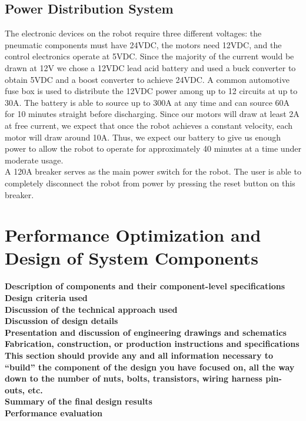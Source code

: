 \documentclass[letterpaper,12pt]{article}
\newcommand{\xxx}[1]{{\color{red}\bf #1}}
\begin{document}
\subsection{Power Distribution System}
The electronic devices on the robot require three different voltages: the
pneumatic components must have 24VDC, the motors need 12VDC, and the control
electronics operate at 5VDC. Since the majority of the current would be drawn
at 12V we chose a 12VDC lead acid battery and used a buck converter to obtain
5VDC and a boost converter to achieve 24VDC. A common automotive fuse box is
used to distribute the 12VDC power among up to 12 circuits at up to 30A. The
battery is able to source up to 300A at any time and can source 60A for 10
minutes straight before discharging. Since our motors will draw at least 2A at
free current, we expect that once the robot achieves a constant velocity, each
motor will draw around 10A. Thus, we expect our battery to give us enough power
to allow the robot to operate for approximately 40 minutes at a time under moderate usage.\\

A 120A breaker serves as the main power switch for the robot. The user is able to completely disconnect the robot from power by pressing the reset button on this breaker. 



\section{Performance Optimization and Design of System Components}
\label{sec:optimization}
\xxx{Description of components and their component-level specifications} \\
\xxx{Design criteria used} \\
\xxx{Discussion of the technical approach used} \\
\xxx{Discussion of design details} \\
\xxx{Presentation and discussion of engineering drawings and schematics} \\
\xxx{Fabrication, construction, or production instructions and specifications} \\
\xxx{This section should provide any and all information necessary to ``build'' the component of the design you have focused on, all the way down to the number of nuts, bolts, transistors, wiring harness pin-outs, etc.} \\
\xxx{Summary of the final design results} \\
\xxx{Performance evaluation}
\end{document}

